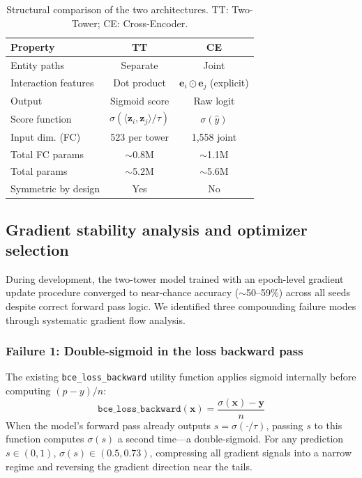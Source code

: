 \documentclass[10pt,twocolumn]{article}
\begin{document}
\begin{table}[!htbp]
\centering
\caption{Structural comparison of the two architectures. TT: Two-Tower; CE: Cross-Encoder.}
\label{tab:arch_comparison}
\small
\begin{tabular}{@{}lcc@{}}
\toprule
\textbf{Property} & \textbf{TT} & \textbf{CE} \\
\midrule
Entity paths        & Separate & Joint \\
Interaction features & Dot product & $\mathbf{e}_i \odot \mathbf{e}_j$ (explicit) \\
Output              & Sigmoid score & Raw logit \\
Score function      & $\sigma(\langle\mathbf{z}_i,\mathbf{z}_j\rangle/\tau)$ & $\sigma(\hat{y})$ \\
Input dim. (FC)     & 523 per tower & 1{,}558 joint \\
Total FC params     & ${\sim}$0.8M & ${\sim}$1.1M \\
Total params        & ${\sim}$5.2M & ${\sim}$5.6M \\
Symmetric by design & Yes & No \\
\bottomrule
\end{tabular}
\end{table}

\subsection{Gradient stability analysis and optimizer selection}
\label{sec:grad_analysis}

During development, the two-tower model trained with an epoch-level gradient
update procedure converged to near-chance accuracy (${\sim}$50--59\%) across
all seeds despite correct forward pass logic.
We identified three compounding failure modes through systematic gradient flow
analysis.

\subsubsection{Failure 1: Double-sigmoid in the loss backward pass}
\label{sec:failure1}
The existing \texttt{bce\_loss\_backward} utility function applies sigmoid
internally before computing $(p - y)/n$:
\begin{equation}
    \texttt{bce\_loss\_backward}(\mathbf{x}) = \frac{\sigma(\mathbf{x}) - \mathbf{y}}{n}
\end{equation}
When the model's forward pass already outputs $s = \sigma(\cdot/\tau)$, passing
$s$ to this function computes $\sigma(s)$ a second time---a double-sigmoid.
For any prediction $s \in (0, 1)$, $\sigma(s) \in (0.5, 0.73)$, compressing
all gradient signals into a narrow regime and reversing the gradient direction
near the tails.
\end{document}
